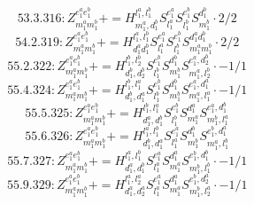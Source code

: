 \documentclass[letterpaper,10pt,fleqn,leqno,onecolumn]{article}
\begin{document}
\begin{equation} \;\;\;\;\;\;  53.3.316: Z^{e_{1}^{a}e_{1}^{b}}_{m_{1}^{a}m_{1}^{b}}+=H^{l_{1}^{a},l_{1}^{b}}_{m_{1}^{a},d_{1}^{b}}S^{e_{1}^{a}}_{l_{1}^{a}}S^{e_{1}^{b}}_{l_{1}^{b}}S^{d_{1}^{b}}_{m_{1}^{b}}\cdot 2/2 \end{equation}
\begin{equation} \;\;\;\;\;\;  54.2.319: Z^{e_{1}^{a}e_{1}^{b}}_{m_{1}^{a}m_{1}^{b}}+=H^{l_{1}^{a},l_{1}^{b}}_{d_{1}^{a}d_{1}^{b}}S^{e_{1}^{a}}_{l_{1}^{a}}S^{e_{1}^{b}}_{l_{1}^{b}}S^{d_{1}^{a}d_{1}^{b}}_{m_{1}^{a}m_{1}^{b}}\cdot 2/2 \end{equation}
\begin{equation} \;\;\;\;\;\;  55.2.322: Z^{e_{1}^{a}e_{1}^{b}}_{m_{1}^{a}m_{1}^{b}}+=H^{l_{1}^{b},l_{2}^{b}}_{d_{1}^{b},d_{2}^{b}}S^{e_{1}^{b}}_{l_{1}^{b}}S^{d_{1}^{b}}_{m_{1}^{b}}S^{e_{1}^{a},d_{2}^{b}}_{m_{1}^{a},l_{2}^{b}}\cdot -1/1 \end{equation}
\begin{equation} \;\;\;\;\;\;  55.4.324: Z^{e_{1}^{a}e_{1}^{b}}_{m_{1}^{a}m_{1}^{b}}+=H^{l_{1}^{b},l_{1}^{a}}_{d_{1}^{b},d_{1}^{a}}S^{e_{1}^{b}}_{l_{1}^{b}}S^{d_{1}^{b}}_{m_{1}^{b}}S^{e_{1}^{a},d_{1}^{a}}_{m_{1}^{a},l_{1}^{a}}\cdot -1/1 \end{equation}
\begin{equation} \;\;\;\;\;\;  55.5.325: Z^{e_{1}^{a}e_{1}^{b}}_{m_{1}^{a}m_{1}^{b}}+=H^{l_{1}^{b},l_{1}^{a}}_{d_{1}^{a},d_{1}^{b}}S^{e_{1}^{b}}_{l_{1}^{b}}S^{d_{1}^{a}}_{m_{1}^{a}}S^{e_{1}^{a},d_{1}^{b}}_{m_{1}^{b},l_{1}^{a}} \end{equation}
\begin{equation} \;\;\;\;\;\;  55.6.326: Z^{e_{1}^{a}e_{1}^{b}}_{m_{1}^{a}m_{1}^{b}}+=H^{l_{1}^{a},l_{1}^{b}}_{d_{1}^{b},d_{1}^{a}}S^{e_{1}^{a}}_{l_{1}^{a}}S^{d_{1}^{b}}_{m_{1}^{b}}S^{e_{1}^{b},d_{1}^{a}}_{m_{1}^{a},l_{1}^{b}} \end{equation}
\begin{equation} \;\;\;\;\;\;  55.7.327: Z^{e_{1}^{a}e_{1}^{b}}_{m_{1}^{a}m_{1}^{b}}+=H^{l_{1}^{a},l_{1}^{b}}_{d_{1}^{a},d_{1}^{b}}S^{e_{1}^{a}}_{l_{1}^{a}}S^{d_{1}^{a}}_{m_{1}^{a}}S^{e_{1}^{b},d_{1}^{b}}_{m_{1}^{b},l_{1}^{b}}\cdot -1/1 \end{equation}
\begin{equation} \;\;\;\;\;\;  55.9.329: Z^{e_{1}^{a}e_{1}^{b}}_{m_{1}^{a}m_{1}^{b}}+=H^{l_{1}^{a},l_{2}^{a}}_{d_{1}^{a},d_{2}^{a}}S^{e_{1}^{a}}_{l_{1}^{a}}S^{d_{1}^{a}}_{m_{1}^{a}}S^{e_{1}^{b},d_{2}^{a}}_{m_{1}^{b},l_{2}^{a}}\cdot -1/1 \end{equation}
\end{document}
